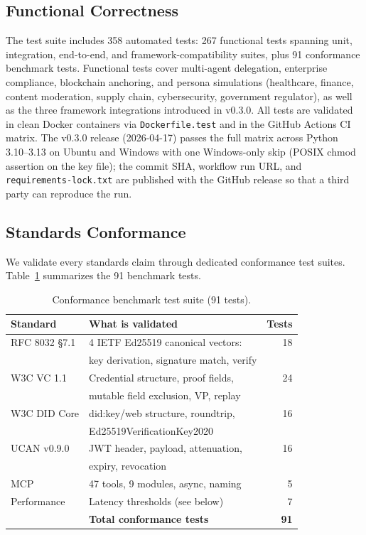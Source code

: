\documentclass[conference]{IEEEtran}
\begin{document}
\subsection{Functional Correctness}

The test suite includes 358 automated tests: 267 functional tests spanning unit, integration, end-to-end, and framework-compatibility suites, plus 91 conformance benchmark tests. Functional tests cover multi-agent delegation, enterprise compliance, blockchain anchoring, and persona simulations (healthcare, finance, content moderation, supply chain, cybersecurity, government regulator), as well as the three framework integrations introduced in v0.3.0. All tests are validated in clean Docker containers via \texttt{Dockerfile.test} and in the GitHub Actions CI matrix. The v0.3.0 release (2026-04-17) passes the full matrix across Python 3.10--3.13 on Ubuntu and Windows with one Windows-only skip (POSIX chmod assertion on the key file); the commit SHA, workflow run URL, and \texttt{requirements-lock.txt} are published with the GitHub release so that a third party can reproduce the run.

\subsection{Standards Conformance}

We validate every standards claim through dedicated conformance test suites. Table~\ref{tab:conformance} summarizes the 91 benchmark tests.

\begin{table}[htbp]
\centering
\caption{Conformance benchmark test suite (91 tests).}
\label{tab:conformance}
\begin{tabular}{llr}
\toprule
\textbf{Standard} & \textbf{What is validated} & \textbf{Tests} \\
\midrule
RFC 8032 \S7.1 & 4 IETF Ed25519 canonical vectors: & 18 \\
 & key derivation, signature match, verify & \\
W3C VC 1.1 & Credential structure, proof fields, & 24 \\
 & mutable field exclusion, VP, replay & \\
W3C DID Core & did:key/web structure, roundtrip, & 16 \\
 & Ed25519VerificationKey2020 & \\
UCAN v0.9.0 & JWT header, payload, attenuation, & 16 \\
 & expiry, revocation & \\
MCP & 47 tools, 9 modules, async, naming & 5 \\
Performance & Latency thresholds (see below) & 7 \\
\midrule
 & \textbf{Total conformance tests} & \textbf{91} \\
\bottomrule
\end{tabular}
\end{table}
\end{document}
